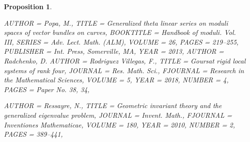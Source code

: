 \documentclass[11pt]{amsart}
\newtheorem{proposition}[theorem]{Proposition}
\numberwithin{theorem}{subsection}
\begin{document}
{\begin{proposition}
\begin{bibdiv}
\begin{biblist}
 {
    AUTHOR = {Popa, M.},
     TITLE = {Generalized theta linear series on moduli spaces of vector
              bundles on curves},
 BOOKTITLE = {Handbook of moduli. {V}ol. {III}},
    SERIES = {Adv. Lect. Math. (ALM)},
    VOLUME = {26},
     PAGES = {219--255},
 PUBLISHER = {Int. Press, Somerville, MA},
      YEAR = {2013},
}
 {
    AUTHOR = {Radchenko, D.}
    AUTHOR = {Rodriguez Villegas, F.},
     TITLE = {Goursat rigid local systems of rank four},
   JOURNAL = {Res. Math. Sci.},
  FJOURNAL = {Research in the Mathematical Sciences},
    VOLUME = {5},
      YEAR = {2018},
    NUMBER = {4},
     PAGES = {Paper No. 38, 34},
}
	
 {
    AUTHOR = {Ressayre, N.},
     TITLE = {Geometric invariant theory and the generalized eigenvalue
              problem},
   JOURNAL = {Invent. Math.},
  FJOURNAL = {Inventiones Mathematicae},
    VOLUME = {180},
      YEAR = {2010},
    NUMBER = {2},
     PAGES = {389--441},
}

	




\end{biblist}
\end{bibdiv}
\end{proposition}}
\end{document}
